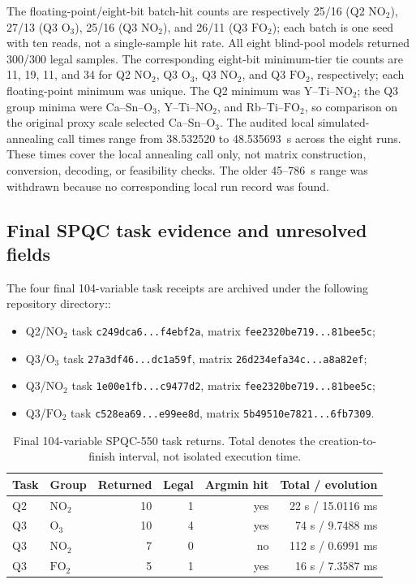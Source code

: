 The floating-point/eight-bit batch-hit counts are respectively
25/16 (Q2 $\mathrm{NO}_2$), 27/13 (Q3 $\mathrm{O}_3$), 25/16 (Q3 $\mathrm{NO}_2$), and 26/11 (Q3 $\mathrm{FO}_2$);
each batch is one seed with ten reads, not a single-sample hit rate.
All eight blind-pool models returned 300/300 legal samples.  The
corresponding eight-bit minimum-tier tie counts are 11, 19, 11, and 34
for Q2 $\mathrm{NO}_2$, Q3 $\mathrm{O}_3$, Q3 $\mathrm{NO}_2$, and Q3 $\mathrm{FO}_2$, respectively; each floating-point
minimum was unique.  The Q2 minimum was Y--Ti--$\mathrm{NO}_2$; the Q3 group minima
were Ca--Sn--$\mathrm{O}_3$, Y--Ti--$\mathrm{NO}_2$, and Rb--Ti--$\mathrm{FO}_2$, so comparison on the
original proxy scale selected Ca--Sn--$\mathrm{O}_3$.  The audited local
simulated-annealing call times
range from 38.532520 to 48.535693~s across the eight runs.  These times
cover the local annealing call only, not matrix construction, conversion,
decoding, or feasibility checks.  The older 45--786~s range was withdrawn
because no corresponding local run record was found.

\subsection{Final SPQC task evidence and unresolved fields}

The four final 104-variable task receipts are archived under the following
repository directory:\linebreak[4]
:

\begin{itemize}[leftmargin=2em]
 \item Q2/$\mathrm{NO}_2$ task \texttt{c249dca6...f4ebf2a}, matrix
       \texttt{fee2320be719...81bee5c};
 \item Q3/$\mathrm{O}_3$ task \texttt{27a3df46...dc1a59f}, matrix
       \texttt{26d234efa34c...a8a82ef};
 \item Q3/$\mathrm{NO}_2$ task \texttt{1e00e1fb...c9477d2}, matrix
       \texttt{fee2320be719...81bee5c};
 \item Q3/$\mathrm{FO}_2$ task \texttt{c528ea69...e99ee8d}, matrix
       \texttt{5b49510e7821...6fb7309}.
\end{itemize}

\begin{table}[!htbp]
\centering
\caption{Final 104-variable SPQC-550 task returns.  Total denotes the
creation-to-finish interval, not isolated execution time.}
\label{tab:spqc-final-results}
\small
\begin{tabularx}{\textwidth}{@{}lXrrrr@{}}
\toprule
Task & Group & Returned & Legal & Argmin hit & Total / evolution \\
\midrule
Q2 & $\mathrm{NO}_2$ & 10 & 1 & yes & 22 s / 15.0116 ms \\
Q3 & $\mathrm{O}_3$  & 10 & 4 & yes & 74 s / 9.7488 ms \\
Q3 & $\mathrm{NO}_2$ & 7  & 0 & no  & 112 s / 0.6991 ms \\
Q3 & $\mathrm{FO}_2$ & 5  & 1 & yes & 16 s / 7.3587 ms \\
\bottomrule
\end{tabularx}
\end{table}

